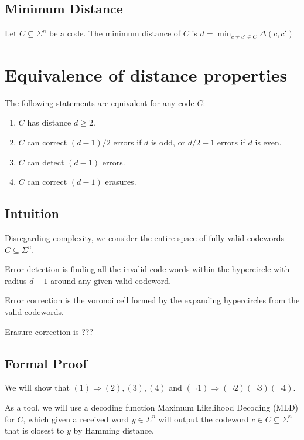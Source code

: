 \documentclass{idc_msc}
\begin{document}
\subsection{Minimum Distance}

Let $C \subseteq \Sigma^n$ be a code. The minimum distance of $C$ is $d = \min_{c \ne c' \in C} \Delta(c,c')$


\section{Equivalence of distance properties}

The following statements are equivalent for any code $C$:

\begin{enumerate}
  \item $C$ has distance $d \ge 2$.
  \item $C$ can correct $(d-1) / 2$ errors if $d$ is odd, or $d / 2 - 1$ errors if $d$ is even.
  \item $C$ can detect $(d-1)$ errors.
  \item $C$ can correct $(d-1)$ erasures.
\end{enumerate}

\subsection{Intuition}

Disregarding complexity, we consider the entire space of fully valid codewords $C \subseteq \Sigma^n$.

Error detection is finding all the invalid code words within the hypercircle with radius $d-1$ around any given valid codeword.

Error correction is the voronoi cell formed by the expanding hypercircles from the valid codewords.

Erasure correction is ???

\subsection{Formal Proof}

We will show that $(1) \Rightarrow (2), (3), (4)$ and $(\lnot 1) \Rightarrow (\lnot 2) (\lnot 3) (\lnot 4)$.

As a tool, we will use a decoding function Maximum Likelihood Decoding (MLD) for $C$, which given a received word $y \in \Sigma^n$ will output the codeword $c \in C \subseteq \Sigma^n$ that is closest to $y$ by Hamming distance.
\end{document}
